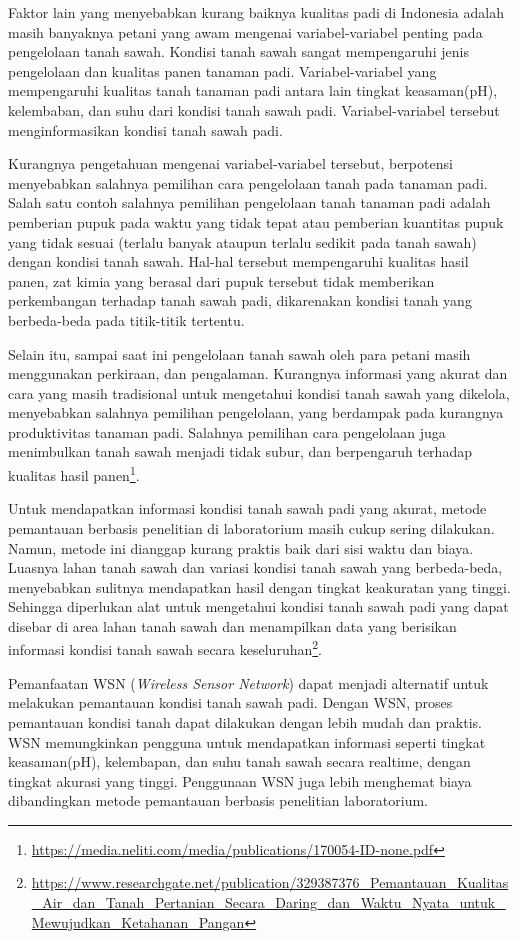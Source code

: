 Faktor lain yang menyebabkan kurang baiknya kualitas padi di Indonesia adalah masih banyaknya petani yang awam mengenai variabel-variabel penting pada pengelolaan tanah sawah. Kondisi tanah sawah sangat mempengaruhi jenis pengelolaan dan kualitas panen tanaman padi. Variabel-variabel yang mempengaruhi kualitas tanah tanaman padi antara lain tingkat keasaman(pH), kelembaban, dan suhu dari kondisi tanah sawah padi. Variabel-variabel tersebut menginformasikan kondisi tanah sawah padi. 

Kurangnya pengetahuan mengenai variabel-variabel tersebut, berpotensi menyebabkan salahnya pemilihan cara pengelolaan tanah pada tanaman padi. Salah satu contoh salahnya pemilihan pengelolaan tanah tanaman padi adalah pemberian pupuk pada waktu yang tidak tepat atau pemberian kuantitas pupuk yang tidak sesuai (terlalu banyak ataupun terlalu sedikit pada tanah sawah) dengan kondisi tanah sawah. Hal-hal tersebut mempengaruhi kualitas hasil panen, zat kimia yang berasal dari pupuk tersebut tidak memberikan perkembangan terhadap tanah sawah padi, dikarenakan kondisi tanah yang berbeda-beda pada titik-titik tertentu.

Selain itu, sampai saat ini pengelolaan tanah sawah oleh para petani masih menggunakan perkiraan, dan pengalaman. Kurangnya informasi yang akurat dan cara yang masih tradisional untuk mengetahui kondisi tanah sawah yang dikelola, menyebabkan salahnya pemilihan pengelolaan, yang berdampak pada kurangnya produktivitas tanaman padi. Salahnya pemilihan cara pengelolaan juga menimbulkan tanah sawah menjadi tidak subur, dan berpengaruh terhadap kualitas hasil panen\footnote{\url{https://media.neliti.com/media/publications/170054-ID-none.pdf}}.

Untuk mendapatkan informasi kondisi tanah sawah padi yang akurat, metode pemantauan berbasis penelitian di laboratorium masih cukup sering dilakukan. Namun, metode ini dianggap kurang praktis baik dari sisi waktu dan biaya. Luasnya lahan tanah sawah dan variasi kondisi tanah sawah yang berbeda-beda, menyebabkan sulitnya mendapatkan hasil dengan tingkat keakuratan yang tinggi. Sehingga diperlukan alat untuk mengetahui kondisi tanah sawah padi yang dapat disebar di area lahan tanah sawah dan menampilkan data yang berisikan informasi kondisi tanah sawah secara keseluruhan\footnote{\url{https://www.researchgate.net/publication/329387376_Pemantauan_Kualitas_Air_dan_Tanah_Pertanian_Secara_Daring_dan_Waktu_Nyata_untuk_Mewujudkan_Ketahanan_Pangan}}.

Pemanfaatan WSN (\textit{Wireless Sensor Network}) dapat menjadi alternatif untuk melakukan pemantauan kondisi tanah sawah padi. Dengan WSN, proses pemantauan kondisi tanah dapat dilakukan dengan lebih mudah dan praktis. WSN memungkinkan pengguna untuk mendapatkan informasi seperti tingkat keasaman(pH), kelembapan, dan suhu tanah sawah secara realtime, dengan tingkat akurasi yang tinggi. Penggunaan WSN juga lebih menghemat biaya dibandingkan metode pemantauan berbasis penelitian laboratorium.

